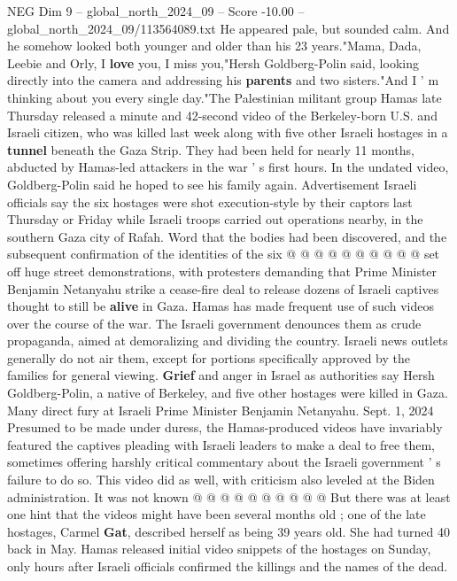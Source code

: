 \begin{textsample}{NEG Dim 9 – global\_north\_2024\_09 – Score -10.00 – global\_north\_2024\_09/113564089.txt}  \label{ex:f9_neg_013}
He appeared pale, but sounded calm.
And he somehow looked both younger and older than his 23 years."Mama, Dada, Leebie and Orly, I \textbf{love} you, I miss you,"Hersh Goldberg-Polin said, looking directly into the camera and addressing his \textbf{parents} and two sisters."And I ' m thinking about you every single day."The Palestinian militant group Hamas late Thursday released a minute and 42-second video of the Berkeley-born U.S. and Israeli citizen, who was killed last week along with five other Israeli hostages in a \textbf{tunnel} beneath the Gaza Strip.
They had been held for nearly 11 months, abducted by Hamas-led attackers in the war ' s first hours.
In the undated video, Goldberg-Polin said he hoped to see his family again.
Advertisement Israeli officials say the six hostages were shot execution-style by their captors last Thursday or Friday while Israeli troops carried out operations nearby, in the southern Gaza city of Rafah.
Word that the bodies had been discovered, and the subsequent confirmation of the identities of the six @ @ @ @ @ @ @ @ @ @ set off huge street demonstrations, with protesters demanding that Prime Minister Benjamin Netanyahu strike a cease-fire deal to release dozens of Israeli captives thought to still be \textbf{alive} in Gaza.
Hamas has made frequent use of such videos over the course of the war.
The Israeli government denounces them as crude propaganda, aimed at demoralizing and dividing the country.
Israeli news outlets generally do not air them, except for portions specifically approved by the families for general viewing. \textbf{Grief} and anger in Israel as authorities say Hersh Goldberg-Polin, a native of Berkeley, and five other hostages were killed in Gaza.
Many direct fury at Israeli Prime Minister Benjamin Netanyahu.
Sept. 1, 2024 Presumed to be made under duress, the Hamas-produced videos have invariably featured the captives pleading with Israeli leaders to make a deal to free them, sometimes offering harshly critical commentary about the Israeli government ' s failure to do so.
This video did as well, with criticism also leveled at the Biden administration.
It was not known @ @ @ @ @ @ @ @ @ @ But there was at least one hint that the videos might have been several months old ; one of the late hostages, Carmel \textbf{Gat}, described herself as being 39 years old.
She had turned 40 back in May.
Hamas released initial video snippets of the hostages on Sunday, only hours after Israeli officials confirmed the killings and the names of the dead.

\end{textsample}
